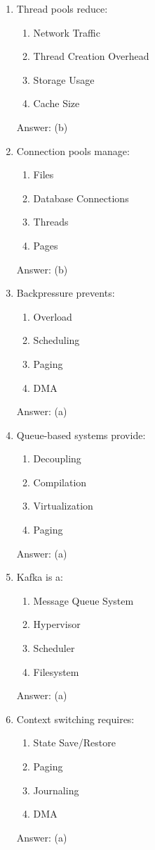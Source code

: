 \begin{enumerate}
\item Thread pools reduce:
\begin{enumerate}[label=(\alph*)]
\item Network Traffic
\item Thread Creation Overhead
\item Storage Usage
\item Cache Size
\end{enumerate}
Answer: (b)

\item Connection pools manage:
\begin{enumerate}[label=(\alph*)]
\item Files
\item Database Connections
\item Threads
\item Pages
\end{enumerate}
Answer: (b)

\item Backpressure prevents:
\begin{enumerate}[label=(\alph*)]
\item Overload
\item Scheduling
\item Paging
\item DMA
\end{enumerate}
Answer: (a)

\item Queue-based systems provide:
\begin{enumerate}[label=(\alph*)]
\item Decoupling
\item Compilation
\item Virtualization
\item Paging
\end{enumerate}
Answer: (a)

\item Kafka is a:
\begin{enumerate}[label=(\alph*)]
\item Message Queue System
\item Hypervisor
\item Scheduler
\item Filesystem
\end{enumerate}
Answer: (a)

\item Context switching requires:
\begin{enumerate}[label=(\alph*)]
\item State Save/Restore
\item Paging
\item Journaling
\item DMA
\end{enumerate}
Answer: (a)


\end{enumerate}
